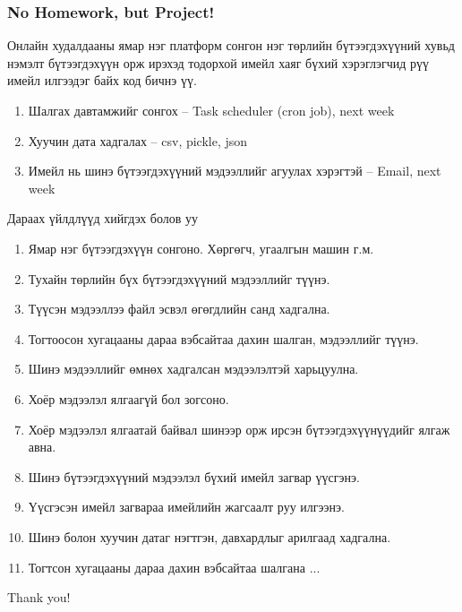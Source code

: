 \documentclass{beamer}
\begin{document}
\begin{frame}
    \frametitle{No Homework, but Project!}
    
\begin{flushleft}
    Онлайн худалдааны ямар нэг платформ сонгон нэг төрлийн бүтээгдэхүүний хувьд
    нэмэлт бүтээгдэхүүн орж ирэхэд тодорхой имейл хаяг бүхий хэрэглэгчид рүү 
    имейл илгээдэг байх код бичнэ үү. 

    \begin{enumerate}
        \item Шалгах давтамжийг сонгох – Task scheduler (cron job), next week
        \item Хуучин дата хадгалах – csv, pickle, json
        \item Имейл нь шинэ бүтээгдэхүүний мэдээллийг агуулах хэрэгтэй – Email, next week
    \end{enumerate}

    \tiny
Дараах үйлдлүүд хийгдэх болов уу
    \begin{enumerate}
        \item Ямар нэг бүтээгдэхүүн сонгоно. Хөргөгч, угаалгын машин г.м. 
        \item Тухайн төрлийн бүх бүтээгдэхүүний мэдээллийг түүнэ. 
        \item Түүсэн мэдээллээ файл эсвэл өгөгдлийн санд хадгална.
        \item Тогтоосон хугацааны дараа вэбсайтаа дахин шалган, мэдээллийг түүнэ. 
        \item Шинэ мэдээллийг өмнөх хадгалсан мэдээлэлтэй харьцуулна. 
        \item Хоёр мэдээлэл ялгаагүй бол зогсоно. 
        \item Хоёр мэдээлэл ялгаатай байвал шинээр орж ирсэн бүтээгдэхүүнүүдийг ялгаж авна. 
        \item Шинэ бүтээгдэхүүний мэдээлэл бүхий имейл загвар үүсгэнэ. 
        \item Үүсгэсэн имейл загвараа имейлийн жагсаалт руу илгээнэ. 
        \item Шинэ болон хуучин датаг нэгтгэн, давхардлыг арилгаад хадгална. 
        \item Тогтсон хугацааны дараа дахин вэбсайтаа шалгана ...
    \end{enumerate}

\end{flushleft}
\end{frame}

\begin{frame}
\Huge{\centerline{Thank you!}}
\end{frame}

\end{document}
